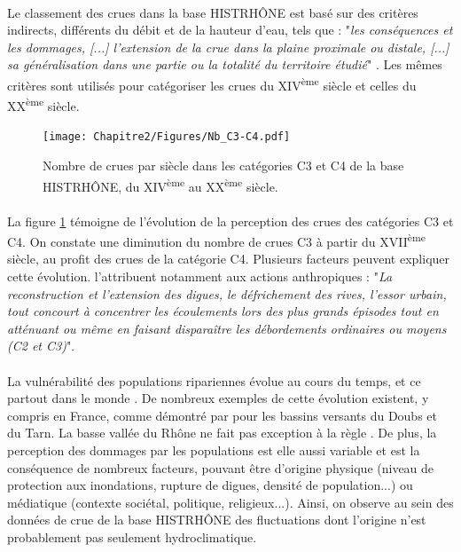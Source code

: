 	\paragraph{} Le classement des crues dans la base HISTRHÔNE est basé sur des critères indirects, différents du débit et de la hauteur d'eau, tels que : "\textit{les conséquences et les dommages, [...] l'extension de la crue dans la plaine proximale ou distale, [...] sa généralisation dans une partie ou la totalité du territoire étudié}" \citep{pichard_sept_2014}. Les mêmes critères sont utilisés pour catégoriser les crues du XIV\textsuperscript{ème} siècle et celles du XX\textsuperscript{ème} siècle. 
	
	\begin{figure}[h]
	\centering
		\texttt{[image: Chapitre2/Figures/Nb\_C3-C4.pdf]}
        \caption{Nombre de crues par siècle dans les catégories C3 et C4 de la base HISTRHÔNE, du XIV\textsuperscript{ème} au XX\textsuperscript{ème} siècle.}
		\label{fig:Nb_C3C4}
	\end{figure}	
	
	\paragraph{} La figure \ref{fig:Nb_C3C4} témoigne de l'évolution de la perception des crues des catégories C3 et C4. On constate une diminution du nombre de crues C3 à partir du XVII\textsuperscript{ème} siècle, au profit des crues de la catégorie C4. Plusieurs facteurs peuvent expliquer cette évolution. \citet{pichard_sept_2014} l'attribuent notamment aux actions anthropiques : "\textit{La reconstruction et l'extension des digues, le défrichement des rives, l'essor urbain, tout concourt à concentrer les écoulements lors des plus grands épisodes tout en atténuant ou même en faisant disparaître les débordements ordinaires ou moyens (C2 et C3)}". 
	
	\paragraph{} La vulnérabilité des populations ripariennes évolue au cours du temps, et ce partout dans le monde \citep{kron_flood_2002}. De nombreux exemples de cette évolution existent, y compris en France, comme démontré par \citet{boudou_assessing_2016} pour les bassins versants du Doubs et du Tarn. La basse vallée du Rhône ne fait pas exception à la règle \citep{piegay_observatoire_2022}. De plus, la perception des dommages par les populations est elle aussi variable et est la conséquence de nombreux facteurs, pouvant être d'origine physique (niveau de protection aux inondations, rupture de digues, densité de population...) ou médiatique (contexte sociétal, politique, religieux...). Ainsi, on observe au sein des données de crue de la base HISTRHÔNE des fluctuations dont l'origine n'est probablement pas seulement hydroclimatique. 
	
